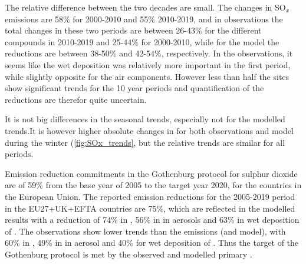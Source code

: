 The relative difference between the two decades are small. The changes in SO$_x$ emissions are 58\% for 2000-2010 and 55\% 2010-2019, and in observations the total changes in these two periods are between 26-43\% for the different compounds in 2010-2019 and 25-44\% for 2000-2010, while for the model the reductions are between 38-50\% and 42-54\%, respectively.  In the observations, it seems like the wet deposition was relatively more important in the first period, while slightly opposite for the air components.	However less than half the sites show significant trends for the 10 year periods and quantification of the reductions are therefor quite uncertain. 

It is not big differences in the seasonal trends, especially not for the modelled trends.It is however higher absolute changes in \soii for both observations and model during the winter (\ref{fig:SOx_trends}, but the relative trends are similar for all periods.

Emission reduction commitments in the Gothenburg protocol for sulphur dioxide are of 59\% from the base year of 2005 to the target year 2020, for the countries in the European Union. The reported emission reductions for the 2005-2019 period in the EU27+UK+EFTA countries are 75\%, which are reflected in the modelled results with a reduction of 74\% in \soii, 56\% in \soiv in aerosols and 63\% in wet deposition of \soiv. The observations show lower trends than the emissions (and model), with 60\% in \soii, 49\% in \soiv in aerosol and 40\% for wet deposition of \soiv. Thus the target of the Gothenburg protocol is met by the observed and modelled primary \soii.



